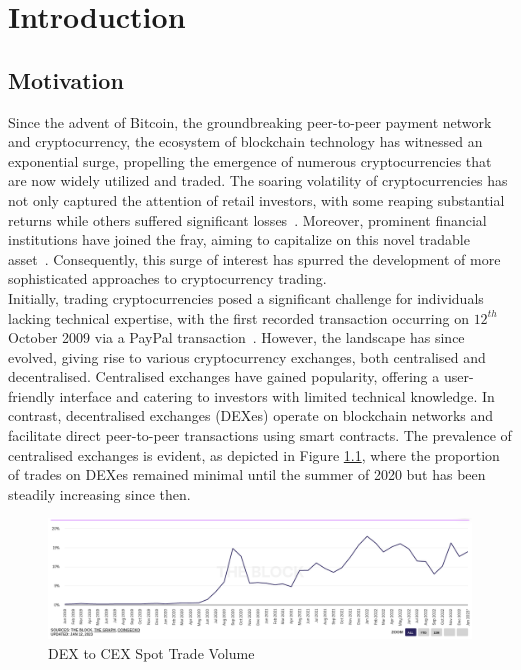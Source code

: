 \chapter{Introduction}
\section{Motivation}
Since the advent of Bitcoin, the groundbreaking peer-to-peer payment network and cryptocurrency, the ecosystem of blockchain technology has witnessed an exponential surge, propelling the emergence of numerous cryptocurrencies that are now widely utilized and traded. The soaring volatility of cryptocurrencies has not only captured the attention of retail investors, with some reaping substantial returns while others suffered significant losses~\cite{losing_money_on_crypto_2021}. Moreover, prominent financial institutions have joined the fray, aiming to capitalize on this novel tradable asset~\cite{gondek_what_nodate}. Consequently, this surge of interest has spurred the development of more sophisticated approaches to cryptocurrency trading.
\\[3mm]
Initially, trading cryptocurrencies posed a significant challenge for individuals lacking technical expertise, with the first recorded transaction occurring on $12^{th}$ October 2009 via a PayPal transaction~\cite{noauthor_history_nodate}. However, the landscape has since evolved, giving rise to various cryptocurrency exchanges, both centralised and decentralised. Centralised exchanges have gained popularity, offering a user-friendly interface and catering to investors with limited technical knowledge. In contrast, decentralised exchanges (DEXes) operate on blockchain networks and facilitate direct peer-to-peer transactions using smart contracts. The prevalence of centralised exchanges is evident, as depicted in Figure \ref{fig:dex_to_cex}, where the proportion of trades on DEXes remained minimal until the summer of 2020 but has been steadily increasing since then.
\vspace{-.2cm}
\begin{figure}[htb!]
    \centering
    \includegraphics[width=\textwidth]{introduction/Images/dex_to_cex.png}
    \caption{{DEX} to {CEX} {Spot} {Trade} {Volume}~\cite{dex_to_cex}}
    \label{fig:dex_to_cex}
\end{figure}
\vspace{-1cm}

